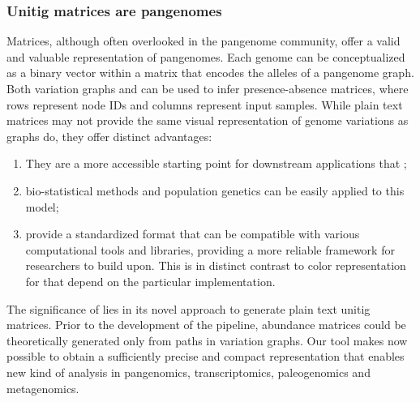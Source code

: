 \subsubsection*{Unitig matrices are pangenomes}
Matrices, although often overlooked in the pangenome community, offer a valid and valuable representation of pangenomes. Each genome can be conceptualized as a binary vector within a matrix that encodes the alleles of a pangenome graph. Both variation graphs and \ccdbgs can be used to infer presence-absence matrices, where rows represent node IDs and columns represent input samples. 
While plain text matrices may not provide the same visual representation of genome variations as graphs do, they offer distinct advantages:
\begin{enumerate}
	\item They are a more accessible starting point for downstream applications that \dbgs;
	\item bio-statistical methods and population genetics can be easily applied to this model;
	\item provide a standardized format that can be compatible with various computational tools and libraries, providing a more reliable framework for researchers to build upon. This is in distinct contrast to color representation for \ccdbgs that depend on the particular implementation.
\end{enumerate} 
The significance of \muset lies in its novel approach to generate plain text unitig matrices. Prior to the development of the \muset pipeline, abundance matrices could be theoretically generated only from paths in variation graphs. Our tool makes now possible to obtain a sufficiently precise and compact representation that enables new kind of analysis in pangenomics, transcriptomics, paleogenomics and metagenomics.\\
